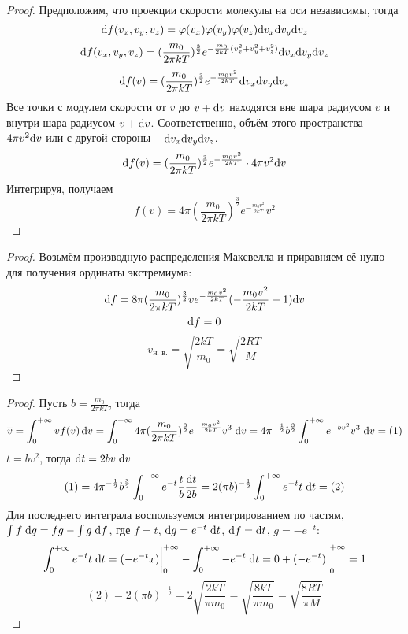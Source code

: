 \begin{proof}
	Предположим, что проекции скорости молекулы на оси независимы, тогда
	\[ \text{d} f(v_x, v_y, v_z) = \varphi(v_x) \varphi(v_y) \varphi(v_z) \text{d} v_x \text{d} v_y \text{d} v_z \]
	\[ \text{d} f(v_x, v_y, v_z) = (\frac{m_0}{2 \pi k T})^{\frac{3}{2}} e^{-\frac{m_0}{2 k T}(v_x^2+v_y^2+v_z^2)} \text{d} v_x \text{d} v_y \text{d} v_z \]
	\[ \text{d} f(v) = (\frac{m_0}{2 \pi k T})^{\frac{3}{2}} e^{-\frac{m_0 v^2}{2 k T}} \text{d} v_x \text{d} v_y \text{d} v_z \]
	Все точки с модулем скорости от $v$ до $v + \text{d} v$ находятся вне шара радиусом $v$ и внутри шара радиусом $v + \text{d} v$. Соответственно, объём этого пространства -- $4 \pi v^2 \text{d} v$ или с другой стороны -- $\text{d} v_x \text{d} v_y \text{d} v_z$.
	\[ \text{d} f(v) = (\frac{m_0}{2 \pi k T})^{\frac{3}{2}} e^{-\frac{m_0 v^2}{2 k T}} \cdot 4 \pi v^2 \text{d} v \]
	Интегрируя, получаем
	\[ f(v) = 4 \pi (\frac{m_0}{2\pi k T})^{\frac{3}{2}} e^{-\frac{m_0 v^2}{2 k T}} v^2 \]
\end{proof}

\begin{proof}
	Возьмём производную распределения Максвелла и приравняем её нулю для получения ординаты экстремиума:
	\[\text{d} f = 8\pi(\frac{m_0}{2\pi k T})^{\frac{3}{2}}ve^{-\frac{m_0v^2}{2 k T}}(-\frac{m_0 v^2}{2kT}+1) \text{d} v\]
	\[\text{d} f = 0\]
	\[v_{\text{н. в.}}=\sqrt{\frac{2kT}{m_0}}=\sqrt{\frac{2RT}{M}}\]
\end{proof}

\begin{proof}
	Пусть $b = \frac{m_0}{2 \pi k T}$, тогда
	\[ \overline{v} = \int_{0}^{+\infty} v f(v) \,\text{d} v =
	\int_{0}^{+\infty} 4 \pi (\frac{m_0}{2\pi k T})^{\frac{3}{2}} e^{-\frac{m_0 v^2}{2 k T}} v^3 \;\text{d} v =
	4 \pi^{-\frac{1}{2}} b^{\frac{3}{2}} \int_{0}^{+\infty} e^{-b v^2} v^3 \;\text{d} v = (1) \]
	$t = b v^2$, тогда $\text{d} t = 2 b v \;\text{d} v $
	\[ (1) = 4 \pi^{-\frac{1}{2}} b^{\frac{3}{2}} \int_{0}^{+\infty} e^{-t} \frac{t}{b} \frac{\text{d} t}{2 b} = 
	2 (\pi b)^{-\frac{1}{2}} \int_{0}^{+\infty} e^{-t} t \;\text{d} t = (2) \]
	Для последнего интеграла воспользуемся интегрированием по частям, $\int f \;\text{d} g = f g - \int g \;\text{d} f$, где $f = t$, $\text{d} g = e^{-t} \;\text{d} t$, $\text{d} f = \text{d} t$, $g = -e^{-t}$:
	\[ \int_{0}^{+\infty} e^{-t} t \;\text{d} t = (-e^{-t} x)\bigg|_{0}^{+\infty} - \int_{0}^{+\infty} -e^{-t} \;\text{d} t = 
	0 + (-e^{-t})\bigg|_{0}^{+\infty} = 1 \]
	\[ (2) = 2 (\pi b)^{-\frac{1}{2}} = 2 \sqrt{\frac{2 k T}{\pi m_0}} = \sqrt{\frac{8 k T}{\pi m_0}} = \sqrt{\frac{8RT}{\pi M}} \]
\end{proof}

